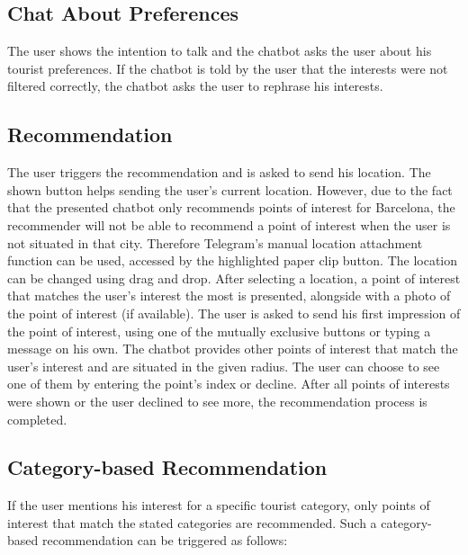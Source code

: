 \subsection{Chat About Preferences}
The user shows the intention to talk and the chatbot asks the user about his tourist preferences. If the chatbot is told by the user that the interests were not filtered correctly, the chatbot asks the user to rephrase his interests. 
 

\subsection{Recommendation}
The user triggers the recommendation and is asked to send his location. The shown button helps sending the user’s current location. However, due to the fact that the presented chatbot only recommends points of interest for Barcelona, the recommender will not be able to recommend a point of interest when the user is not situated in that city. Therefore Telegram’s manual location attachment function can be used, accessed by the highlighted paper clip button. The location can be changed using drag and drop.
After selecting a location, a point of interest that matches the user’s interest the most is presented, alongside with a photo of the point of interest (if available). The user is asked to send his first impression of the point of interest, using one of the mutually exclusive buttons or typing a message on his own.
The chatbot provides other points of interest that match the user’s interest and are situated in the given radius. The user can choose to see one of them by entering the point’s index or decline.
After all points of interests were shown or the user declined to see more, the recommendation process is 
completed.

\subsection{Category-based Recommendation}
If the user mentions his interest for a specific tourist category, only points of interest that match the stated categories are recommended. Such a category-based recommendation can be triggered as follows:

